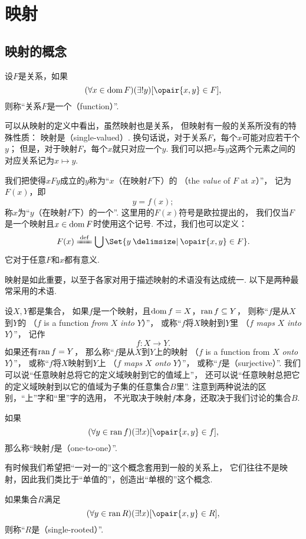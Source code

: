 \section{映射}
\subsection{映射的概念}
\begin{definition}
设\(F\)是关系，如果\[
	(\forall x \in \dom F)(\exists! y)[\opair{x,y} \in F],
\]
则称“关系\(F\)是一个（function）”.
\end{definition}
可以从映射的定义中看出，虽然映射也是关系，
但映射有一般的关系所没有的特殊性质：
映射是（single-valued）.
换句话说，对于关系\(F\)，每个\(x\)可能对应若干个\(y\)；
但是，对于映射\(F\)，每个\(x\)就只对应一个\(y\).
我们可以把\(x\)与\(y\)这两个元素之间的对应关系记为\(x \mapsto y\).

我们把使得\(xFy\)成立的\(y\)称为“\(x\)（在映射\(F\)下）的%
（the \emph{value} of \(F\) at \(x\)）”，
记为\(F(x)\)，即\[
	y = f(x);
\]
称\(x\)为“\(y\)（在映射\(F\)下）的一个”.
这里用的\(F(x)\)符号是欧拉提出的，
我们仅当\(F\)是一个映射且\(x\in\operatorname{dom} F\)时使用这个记号.
不过，我们也可以定义：\[
	F(x) \defeq \bigcup\Set{ y \given \opair{x,y} \in F }.
\]
它对于任意\(F\)和\(x\)都有意义.

映射是如此重要，以至于各家对用于描述映射的术语没有达成统一.
以下是两种最常采用的术语.

设\(X,Y\)都是集合，
如果\(f\)是一个映射，且\(\operatorname{dom} f = X\)，\(\operatorname{ran} f \subseteq Y\)，
则称“\(f\)是从\(X\)到\(Y\)的%
（\(f\) is a function \emph{from} \(X\) \emph{into} \(Y\)）”，
或称“\(f\)将\(X\)映射到\(Y\)里%
（\(f\) \emph{maps} \(X\) \emph{into} \(Y\)）”，
记作\[
	f\colon X \to Y.
\]
如果还有\(\operatorname{ran} f = Y\)，
那么称“\(f\)是从\(X\)到\(Y\)上的映射%
（\(f\) is a function from \(X\) \emph{onto} \(Y\)）”，
或称“\(f\)将\(X\)映射到\(Y\)上%
（\(f\) \emph{maps} \(X\) \emph{onto} \(Y\)）”，
或称“\(f\)是（surjective）”.
我们可以说“任意映射总将它的定义域映射到它的值域上”，
还可以说“任意映射总把它的定义域映射到以它的值域为子集的任意集合\(B\)里”.
注意到两种说法的区别，“上”字和“里”字的选用，
不光取决于映射\(f\)本身，还取决于我们讨论的集合\(B\).

如果\[
	(\forall y \in \ran f)
	(\exists! x)
	[\opair{x,y} \in f],
\]
那么称“映射\(f\)是（one-to-one）”.

有时候我们希望把“一对一的”这个概念套用到一般的关系上，
它们往往不是映射，因此我们类比于“单值的”，创造出“单根的”这个概念.
\begin{definition}
如果集合\(R\)满足\[
	(\forall y \in \ran R)
	(\exists! x)
	[\opair{x,y} \in R],
\]
则称“\(R\)是（single-rooted）”.
\end{definition}

